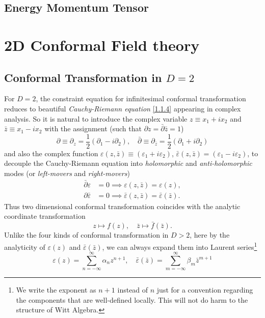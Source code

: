 \documentclass[10pt,nofootinbib]{revtex4}
\begin{document}
	\subsection{Energy Momentum Tensor}



\section{2D Conformal Field theory}
	\subsection{Conformal Transformation in $D=2$}
		For $D=2$, the constraint equation for infinitesimal conformal transformation reduces to beautiful \emph{Cauchy-Riemann equation} \eqref{1.1.4} appearing in complex analysis. So it is natural to introduce the complex variable $z\equiv x_1+ix_2$ and $\bar z\equiv x_1-i x_2$ with the assignment (such that $\partial z=\bar\partial\bar z=1$)
		\begin{equation*}
			\partial\equiv\partial_z=\dfrac{1}{2}(\partial_1-i \partial_2),\quad \bar\partial\equiv\partial_{\bar z}=\dfrac{1}{2}(\partial_1+i \partial_2)
		\end{equation*}
		and also the complex function $\varepsilon(z,\bar z)\equiv(\varepsilon_1+i \varepsilon_2)$, $\bar \varepsilon(z,\bar z)=(\varepsilon_1-i \varepsilon_2)$, to decouple the Cauchy-Riemann equation into \emph{holomorphic} and \emph{anti-holomorphic} modes (or \emph{left-movers} and \emph{right-movers})
		\begin{align*}\label{2.1.1}
			\bar \partial \varepsilon&=0\implies \varepsilon(z,\bar z)=\varepsilon(z),\\
			\partial\bar \varepsilon&=0\implies\bar\varepsilon(z,\bar z)=\bar\varepsilon(\bar z).
		\end{align*}
		Thus two dimensional conformal transformation coincides with the analytic coordinate transformation
		\begin{equation*}
			z\mapsto f(z),\quad \bar z\mapsto\bar f(\bar z).
		\end{equation*}
		\indent Unlike the four kinds of conformal transformation in $D>2$, here by the analyticity of $\varepsilon(z)$ and $\bar\varepsilon(\bar z)$, we can always expand them into Laurent series\footnote{We write the exponent as $n+1$ instead of $n$ just for a convention regarding the components that are well-defined locally. This will not do harm to the structure of Witt Algebra.}
		\begin{equation*}
			\varepsilon(z)=\sum_{n=-\infty}^\infty \alpha_n z^{n+1},\quad \bar\varepsilon(\bar z)=\sum_{m=-\infty}^\infty \beta_m \bar{z}^{m+1}
		\end{equation*}
\end{document}
